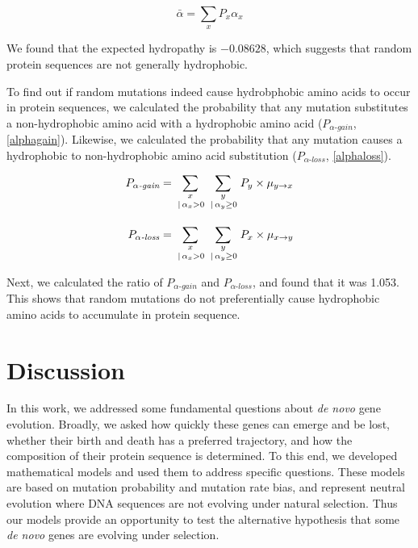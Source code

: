 \documentclass[12pt,a4paper]{article}
\begin{document}
\begin{equation}
\bar{\alpha} = \sum_{x} P_x \alpha_x
\label{expHydropathy}
\end{equation}


We found that the expected hydropathy is $-0.08628$, which suggests that random protein sequences are not generally hydrophobic. 
 
To find out if random mutations indeed cause hydrobphobic amino acids to occur in protein sequences, we calculated the probability that any mutation substitutes a non-hydrophobic amino acid with a hydrophobic amino acid ($P_{\alpha\textit{-gain}}$, \autoref{alphagain}). Likewise, we calculated the probability that any mutation causes a hydrophobic to non-hydrophobic amino acid substitution ($P_{\alpha\textit{-loss}}$, \autoref{alphaloss}).  

\begin{align}
P_{\alpha\textit{-gain}} & = \sum_{\genfrac{}{}{0pt}{1}{x}{\,|\,\alpha_x>0}} \sum_{\genfrac{}{}{0pt}{1}{y}{\,|\,\alpha_y \geq 0}} P_y \times \mu_{y\to x}\label{alphagain}\\[1em]
%
P_{\alpha\textit{-loss}} &= \sum_{\genfrac{}{}{0pt}{1}{x}{\,|\,\alpha_x>0}} \sum_{\genfrac{}{}{0pt}{1}{y}{\,|\,\alpha_y \geq 0}} P_x \times \mu_{x\to y}\label{alphaloss}
\end{align}

Next, we calculated the ratio of $P_{\alpha\textit{-gain}}$ and $P_{\alpha\textit{-loss}}$, and found that it was 1.053. This shows that random mutations do not preferentially cause hydrophobic amino acids to accumulate in protein sequence.

\section{Discussion} 

In this work, we addressed some fundamental questions about \textit{de novo} gene evolution. Broadly, we asked how quickly these genes can emerge and be lost, whether their birth and death has a preferred trajectory, and how the composition of their protein sequence is determined. To this end, we developed mathematical models and used them to address specific questions. These models are based on mutation probability and mutation rate bias, and represent neutral evolution where DNA sequences are not evolving under natural selection. Thus our models provide an opportunity to test the alternative hypothesis that some \textit{de novo} genes are evolving under selection.
\end{document}
